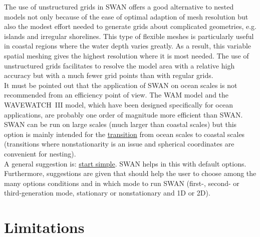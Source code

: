 \documentclass[12pt]{book}
\begin{document}
\noindent
The use of unstructured grids in SWAN offers a good alternative to nested models not only because of the
ease of optimal adaption of mesh resolution but also the modest effort needed to generate
grids about complicated geometries, e.g. islands and irregular shorelines. This type of flexible
meshes is particularly useful in coastal regions where the water depth varies greatly. As a result,
this variable spatial meshing gives the highest resolution where it is most needed. The use of unstructured
grids facilitates to resolve the model area with a relative high accuracy but with a much fewer grid
points than with regular grids.
\\[2ex]
\noindent
It must be pointed out that the application of SWAN on ocean scales is not recommended from an
efficiency point of view. The WAM model and the WAVEWATCH~III model, which have been designed
specifically for ocean applications, are probably one order of magnitude more efficient than
SWAN. SWAN can be run on large scales (much larger than coastal scales) but this option is
mainly intended for the \underline{transition} from ocean scales to coastal scales (transitions
where nonstationarity is an issue and spherical coordinates are convenient for nesting).
\\[2ex]
\noindent
A general suggestion is: \underline{start simple}. SWAN helps in this with default options.
Furthermore, suggestions are given that should help the user to choose among the many options
conditions and in which mode to run SWAN (first-, second- or third-generation mode, stationary
or nonstationary and 1D or 2D).

\section{Limitations}
\end{document}
